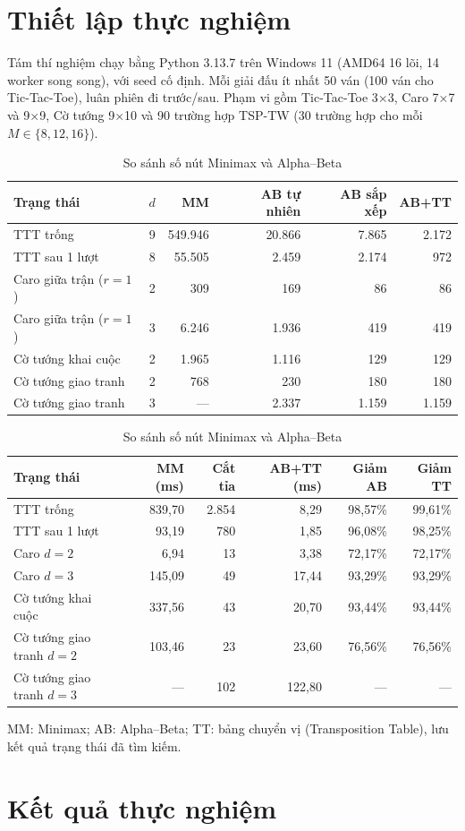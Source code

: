 \documentclass[11pt,a4paper]{article}
\begin{document}
\section{Thiết lập thực nghiệm}
Tám thí nghiệm chạy bằng Python 3.13.7 trên Windows 11 (AMD64 16 lõi, 14 worker song song), với seed cố định. Mỗi giải đấu ít nhất 50 ván (100 ván cho Tic-Tac-Toe), luân phiên đi trước/sau. Phạm vi gồm Tic-Tac-Toe 3×3, Caro 7×7 và 9×9, Cờ tướng 9×10 và 90 trường hợp TSP-TW (30 trường hợp cho mỗi $M\in\{8,12,16\}$).
\begin{table}[H]\centering\caption{So sánh số nút Minimax và Alpha–Beta}\small
\begin{tabular}{lrrrrr}\toprule Trạng thái & $d$ & MM & AB tự nhiên & AB sắp xếp & AB+TT\\\midrule
TTT trống &9&549.946&20.866&7.865&2.172\\
TTT sau 1 lượt&8&55.505&2.459&2.174&972\\
Caro giữa trận ($r=1$)&2&309&169&86&86\\
Caro giữa trận ($r=1$)&3&6.246&1.936&419&419\\
Cờ tướng khai cuộc&2&1.965&1.116&129&129\\
Cờ tướng giao tranh&2&768&230&180&180\\
Cờ tướng giao tranh&3&—&2.337&1.159&1.159\\\bottomrule\end{tabular}
\medskip
\begin{tabular}{lrrrrr}\toprule Trạng thái & MM (ms)& Cắt tỉa& AB+TT (ms)& Giảm AB& Giảm TT\\\midrule
TTT trống&839,70&2.854&8,29&98,57\%&99,61\%\\
TTT sau 1 lượt&93,19&780&1,85&96,08\%&98,25\%\\
Caro $d=2$&6,94&13&3,38&72,17\%&72,17\%\\
Caro $d=3$&145,09&49&17,44&93,29\%&93,29\%\\
Cờ tướng khai cuộc&337,56&43&20,70&93,44\%&93,44\%\\
Cờ tướng giao tranh $d=2$&103,46&23&23,60&76,56\%&76,56\%\\
Cờ tướng giao tranh $d=3$&—&102&122,80&—&—\\\bottomrule\end{tabular}\end{table}
MM: Minimax; AB: Alpha–Beta; TT: bảng chuyển vị (Transposition Table), lưu kết quả trạng thái đã tìm kiếm.
\section{Kết quả thực nghiệm}
\end{document}
